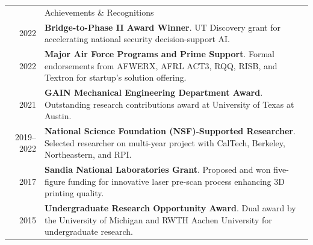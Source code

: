 \documentclass[letterpaper, 11pt]{article}
\newcommand{\headingfont}{\Large\color{CustomBlue}}
\newenvironment{SectionTable}[1]{
	\renewcommand*{\arraystretch}{1.3} %
	\setlength{\tabcolsep}{10pt}
	\begin{longtable}{Rp{4.9in}} & #1 \\}
{\end{longtable}}
\begin{document}
\begin{SectionTable}{\headingfont Achievements \& Recognitions}
2022 & \textbf{Bridge-to-Phase II Award Winner}. UT Discovery grant for accelerating national security decision-support AI. \\

2022 & \textbf{Major Air Force Programs and Prime Support}. Formal endorsements from AFWERX, AFRL ACT3, RQQ, RISB, and Textron for startup's solution offering. \\

2021 & \textbf{GAIN Mechanical Engineering Department Award}. Outstanding research contributions award at University of Texas at Austin. \\

2019--2022 & \textbf{National Science Foundation (NSF)-Supported Researcher}. Selected researcher on multi-year project with CalTech, Berkeley, Northeastern, and RPI. \\

2017 & \textbf{Sandia National Laboratories Grant}. Proposed and won five-figure funding for innovative laser pre-scan process enhancing 3D printing quality. \\

2015 & \textbf{Undergraduate Research Opportunity Award}. Dual award by the University of Michigan and RWTH Aachen University for undergraduate research. \\

\end{SectionTable}

\vspace{-0.5cm}

\end{document}

